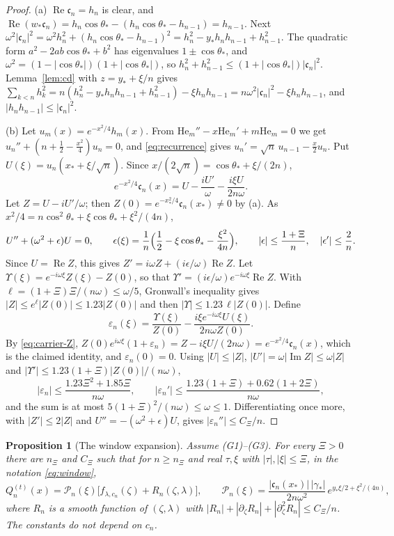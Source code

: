 \documentclass[11pt]{amsart}
\newtheorem{proposition}[theorem]{Proposition}
\theoremstyle{definition}
\theoremstyle{remark}
\numberwithin{equation}{section}
\newcommand{\eps}{\varepsilon}
\newcommand{\He}{\mathrm{He}}
\DeclareMathOperator{\re}{Re}
\DeclareMathOperator{\im}{Im}
\begin{document}
\begin{proof}
(a) $\re\mathfrak c_n=h_n$ is clear, and $\re(w_*\mathfrak c_n)=h_n\cos\theta_*-(h_n\cos\theta_*-h_{n-1})=h_{n-1}$. Next
$\omega^2|\mathfrak c_n|^2=\omega^2h_n^2+(h_n\cos\theta_*-h_{n-1})^2=h_n^2-y_*h_nh_{n-1}+h_{n-1}^2$. The quadratic form
$a^2-2ab\cos\theta_*+b^2$ has eigenvalues $1\pm\cos\theta_*$, and $\omega^2=(1-|\cos\theta_*|)(1+|\cos\theta_*|)$, so
$h_n^2+h_{n-1}^2\le(1+|\cos\theta_*|)|\mathfrak c_n|^2$. Lemma~\ref{lem:cd} with $z=y_*+\xi/n$ gives
$\sum_{k<n}h_k^2=n(h_n^2-y_*h_nh_{n-1}+h_{n-1}^2)-\xi h_nh_{n-1}=n\omega^2|\mathfrak c_n|^2-\xi h_nh_{n-1}$, and
$|h_nh_{n-1}|\le|\mathfrak c_n|^2$.

(b) Let $u_m(x)=e^{-x^2/4}h_m(x)$. From $\He_m''-x\He_m'+m\He_m=0$ we get $u_n''+(n+\frac12-\frac{x^2}4)u_n=0$, and
\eqref{eq:recurrence} gives $u_n'=\sqrt n\,u_{n-1}-\frac x2u_n$. Put $U(\xi)=u_n(x_*+\xi/\sqrt n)$. Since
$x/(2\sqrt n)=\cos\theta_*+\xi/(2n)$,
\begin{equation}\label{eq:carrier-Z}
e^{-x^2/4}\mathfrak c_n(x)=U-\frac{iU'}\omega-\frac{i\xi U}{2n\omega}.
\end{equation}
Let $Z=U-iU'/\omega$; then $Z(0)=e^{-x_*^2/4}\mathfrak c_n(x_*)\ne0$ by (a). As $x^2/4=n\cos^2\theta_*+\xi\cos\theta_*+\xi^2/(4n)$,
\[
U''+(\omega^2+\epsilon)U=0,\qquad \epsilon(\xi)=\frac1n\Bigl(\frac12-\xi\cos\theta_*-\frac{\xi^2}{4n}\Bigr),\qquad
|\epsilon|\le\frac{1+\Xi}n,\quad|\epsilon'|\le\frac2n .
\]
Since $U=\re Z$, this gives $Z'=i\omega Z+(i\epsilon/\omega)\re Z$. Let $\Upsilon(\xi)=e^{-i\omega\xi}Z(\xi)-Z(0)$, so that
$\Upsilon'=(i\epsilon/\omega)e^{-i\omega\xi}\re Z$. With $\ell=(1+\Xi)\Xi/(n\omega)\le\omega/5$, Gronwall's inequality gives
$|Z|\le e^\ell|Z(0)|\le1.23|Z(0)|$ and then $|\Upsilon|\le1.23\,\ell|Z(0)|$. Define
\[
\eps_n(\xi)=\frac{\Upsilon(\xi)}{Z(0)}-\frac{i\xi e^{-i\omega\xi}U(\xi)}{2n\omega Z(0)} .
\]
By \eqref{eq:carrier-Z}, $Z(0)e^{i\omega\xi}(1+\eps_n)=Z-i\xi U/(2n\omega)=e^{-x^2/4}\mathfrak c_n(x)$, which is the claimed
identity, and $\eps_n(0)=0$. Using $|U|\le|Z|$, $|U'|=\omega|\im Z|\le\omega|Z|$ and $|\Upsilon'|\le1.23(1+\Xi)|Z(0)|/(n\omega)$,
\[
|\eps_n|\le\frac{1.23\Xi^2+1.85\Xi}{n\omega},\qquad|\eps_n'|\le\frac{1.23(1+\Xi)+0.62(1+2\Xi)}{n\omega},
\]
and the sum is at most $5(1+\Xi)^2/(n\omega)\le\omega\le1$. Differentiating once more, with $|Z'|\le2|Z|$ and
$U''=-(\omega^2+\epsilon)U$, gives $|\eps_n''|\le C_\Xi/n$.
\end{proof}

\begin{proposition}[The window expansion]\label{prop:window}
Assume (G1)--(G3). For every $\Xi>0$ there are $n_\Xi$ and $C_\Xi$ such that for $n\ge n_\Xi$ and real $\tau,\xi$ with
$|\tau|,|\xi|\le \Xi$, in the notation \eqref{eq:window},
\[
Q_n^{(t)}(x)=\mathcal P_n(\xi)\bigl[f_{\lambda,c_n}(\zeta)+R_n(\zeta,\lambda)\bigr],\qquad
\mathcal P_n(\xi)=\frac{|\mathfrak c_n(x_*)|\,|\gamma_*|}{2n\omega^2}\,e^{y_*\xi/2+\xi^2/(4n)},
\]
where $R_n$ is a smooth function of $(\zeta,\lambda)$ with $|R_n|+|\partial_\zeta R_n|+|\partial_\zeta^2R_n|\le C_\Xi/n$. The
constants do not depend on $c_n$.
\end{proposition}
\end{document}
